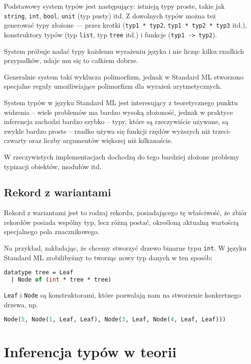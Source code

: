 \documentclass{article}
\begin{document}
Podstawowy system typów jest następujący: istnieją typy proste, takie jak \lstinline$string$, \lstinline$int$, \lstinline$bool$, \lstinline$unit$ (typ pusty) itd. Z dowolnych typów można też generować typy złożone –-- przez krotki (\lstinline$typ1 * typ2$, \lstinline$typ1 * typ2 * typ3$ itd.), konstruktory typów (typ \lstinline$list$, typ \lstinline$tree$ itd.) i funkcje (\lstinline$typ1 -> typ2$).

System próbuje nadać typy każdemu wyrażeniu języka i nie licząc kilku rzadkich przypadków, udaje mu się to całkiem dobrze.

Generalnie system taki wyklucza polimorfizm, jednak w Standard ML stworzono specjalne reguły umożliwiające polimorfizm dla wyrażeń arytmetycznych.

System typów w języku Standard ML jest interesujący z teoretycznego punktu widzenia – wiele problemów ma bardzo wysoką złożoność, jednak w praktyce inferencja zachodzi bardzo szybko – typy, które są rzeczywiście używane, są zwykle bardzo proste – rzadko używa się funkcji rzędów wyższych niż trzeci-czwarty oraz liczby argumentów większej niż kilkanaście.

W rzeczywistych implementacjach dochodzą do tego bardziej złożone problemy typizacji obiektów, modułów itd.

\subsection{Rekord z wariantami} Rekord z wariantami jest to rodzaj rekordu, posiadającego tę właściwość, że zbiór rekordów posiada wspólny typ, lecz różną postać, określoną aktualną wartością specjalnego pola znacznikowego.

Na przykład, zakładając, że chcemy stworzyć drzewo binarne typu \lstinline$int$. W języku Standard ML zrobilibyśmy to tworząc nowy typ danych w ten sposób:
\begin{lstlisting}[language=ML]
datatype tree = Leaf
  | Node of (int * tree * tree)
\end{lstlisting}
\lstinline{Leaf} i \lstinline{Node} są konstruktorami, które pozwalają nam na stworzenie konkretnego drzewa, np.
\begin{lstlisting}[language=ML]
  Node(5, Node(1, Leaf, Leaf), Node(3, Leaf, Node(4, Leaf, Leaf)))
\end{lstlisting}
\section{Inferencja typów w teorii}
\end{document}
